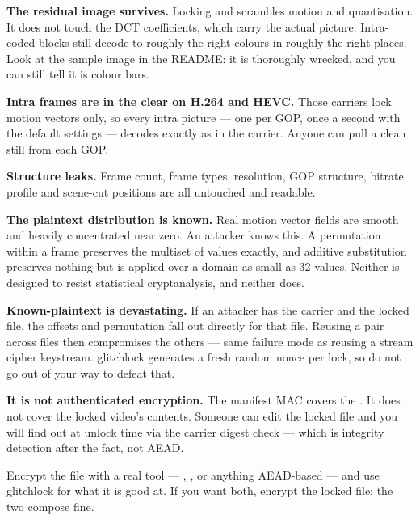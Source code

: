 \documentclass[fontpath=fonts/,logopath=logo/]{riposte-doc}
\begin{document}
\begin{ripbullets}
\item \textbf{The residual image survives.} Locking  and  scrambles motion and quantisation. It does not touch the DCT coefficients, which carry the actual picture. Intra-coded blocks still decode to roughly the right colours in roughly the right places. Look at the sample image in the README: it is thoroughly wrecked, and you can still tell it is colour bars.
\item \textbf{Intra frames are in the clear on H.264 and HEVC.} Those carriers lock motion vectors only, so every intra picture — one per GOP, once a second with the default  settings — decodes exactly as in the carrier. Anyone can pull a clean still from each GOP.
\item \textbf{Structure leaks.} Frame count, frame types, resolution, GOP structure, bitrate profile and scene-cut positions are all untouched and readable.
\item \textbf{The plaintext distribution is known.} Real motion vector fields are smooth and heavily concentrated near zero. An attacker knows this. A permutation within a frame preserves the multiset of values exactly, and additive substitution preserves nothing but is applied over a domain as small as 32 values. Neither is designed to resist statistical cryptanalysis, and neither does.
\item \textbf{Known-plaintext is devastating.} If an attacker has the carrier and the locked file, the offsets and permutation fall out directly for that file. Reusing a  pair across files then compromises the others — same failure mode as reusing a stream cipher keystream. glitchlock generates a fresh random nonce per lock, so do not go out of your way to defeat that.
\item \textbf{It is not authenticated encryption.} The manifest MAC covers the . It does not cover the locked video's contents. Someone can edit the locked file and you will find out at unlock time via the carrier digest check — which is integrity detection after the fact, not AEAD.
\end{ripbullets}



Encrypt the file with a real tool — , , or anything AEAD-based — and use glitchlock for what it is good at. If you want both, encrypt the locked file; the two compose fine.
\end{document}
